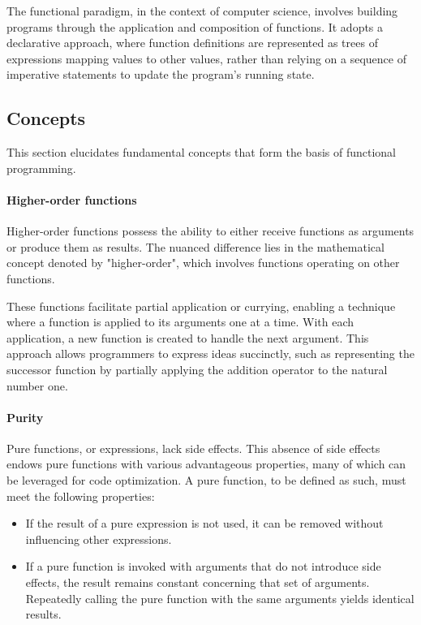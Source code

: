 \documentclass[12pt,a4paper,openright,twoside]{book}
\begin{document}
The functional paradigm, in the context of computer science, involves building programs through the application and composition of functions. It adopts a declarative approach, where function definitions are represented as trees of expressions mapping values to other values, rather than relying on a sequence of imperative statements to update the program's running state.

\subsection{Concepts}

This section elucidates fundamental concepts that form the basis of functional programming.

\paragraph{Higher-order functions}

Higher-order functions possess the ability to either receive functions as arguments or produce them as results. The nuanced difference lies in the mathematical concept denoted by "higher-order", which involves functions operating on other functions.

These functions facilitate partial application or currying, enabling a technique where a function is applied to its arguments one at a time. With each application, a new function is created to handle the next argument. This approach allows programmers to express ideas succinctly, such as representing the successor function by partially applying the addition operator to the natural number one.

\paragraph{Purity}
Pure functions, or expressions, lack side effects. This absence of side effects endows pure functions with various advantageous properties, many of which can be leveraged for code optimization. A pure function, to be defined as such, must meet the following properties:

\begin{itemize}
    \item If the result of a pure expression is not used, it can be removed without influencing other expressions.
    \item If a pure function is invoked with arguments that do not introduce side effects, the result remains constant concerning that set of arguments. Repeatedly calling the pure function with the same arguments yields identical results.
\end{itemize}
\end{document}
